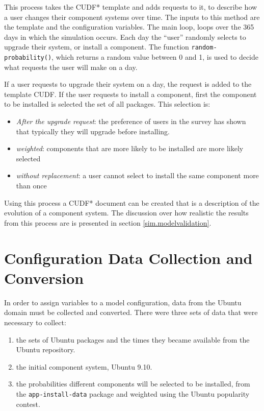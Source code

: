 This process takes the CUDF* template and adds requests to it, to describe how a user changes their component systems over time.
The inputs to this method are the template and the configuration variables.
The main loop, loops over the 365 days in which the simulation occurs.
Each day the ``user'' randomly selects to upgrade their system, or install a component.
The function \texttt{random-probability()}, which returns a random value between 0 and 1, is used to decide what requests the user will make on a day.

If a user requests to upgrade their system on a day, the request is added to the template CUDF.
If the user requests to install a component, first the component to be installed is selected the set of all packages.
This selection is: 
\begin{itemize}
  \item \textit{After the upgrade request}: the preference of users in the survey has shown that typically they will upgrade before installing.  
  \item \textit{weighted}: components that are more likely to be installed are more likely selected
  \item \textit{without replacement}: a user cannot select to install the same component more than once
\end{itemize} 

Using this process a CUDF* document can be created that is a description of the evolution of a component system.
The discussion over how realistic the results from this process are is presented in section \ref{sim.modelvalidation}.

\section{Configuration Data Collection and Conversion}
\label{sim.collection}
In order to assign variables to a \usermodel model configuration, data from the Ubuntu domain must be collected and converted.
There were three sets of data that were necessary to collect:
\begin{enumerate}
  \item the sets of Ubuntu packages and the times they became available from the Ubuntu repository.
  \item the initial component system, Ubuntu 9.10.
  \item the probabilities different components will be selected to be installed, from the \texttt{app-install-data} package and weighted using the Ubuntu popularity contest.
\end{enumerate}

